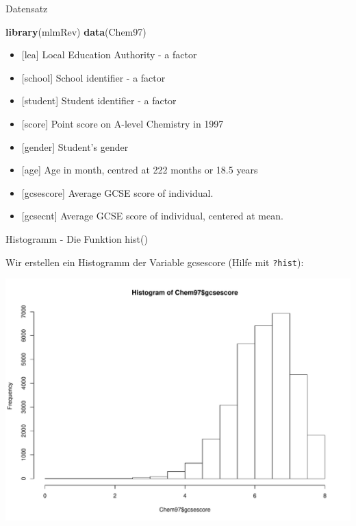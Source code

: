 \documentclass[ignorenonframetext,]{beamer}
\newenvironment{Shaded}{}{}
\newcommand{\KeywordTok}[1]{\textcolor[rgb]{0.00,0.44,0.13}{\textbf{{#1}}}}
\newcommand{\NormalTok}[1]{{#1}}
\providecommand{\tightlist}{%
\setlength{\itemsep}{0pt}\setlength{\parskip}{0pt}}
\begin{document}
\begin{frame}[fragile]{Datensatz}

\begin{Shaded}
\begin{Highlighting}[]
\KeywordTok{library}\NormalTok{(mlmRev)}
\KeywordTok{data}\NormalTok{(Chem97)}
\end{Highlighting}
\end{Shaded}

\begin{itemize}
\tightlist
\item
  {[}lea{]} Local Education Authority - a factor
\item
  {[}school{]} School identifier - a factor
\item
  {[}student{]} Student identifier - a factor
\item
  {[}score{]} Point score on A-level Chemistry in 1997
\item
  {[}gender{]} Student's gender
\item
  {[}age{]} Age in month, centred at 222 months or 18.5 years
\item
  {[}gcsescore{]} Average GCSE score of individual.
\item
  {[}gcsecnt{]} Average GCSE score of individual, centered at mean.
\end{itemize}

\end{frame}

\begin{frame}[fragile]{Histogramm - Die Funktion hist()}

Wir erstellen ein Histogramm der Variable gcsescore (Hilfe mit
\texttt{?hist}):

\begin{Shaded}
\end{Shaded}

\includegraphics{R_intern_files/figure-beamer/unnamed-chunk-149-1.pdf}

\end{frame}
\end{document}

